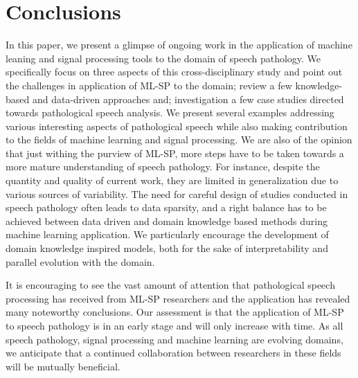 \documentclass{article}
\begin{document}
\section{Conclusions}

In this paper, we present a glimpse of ongoing work in the application of machine leaning and signal processing tools to the domain of speech pathology.
We specifically focus on three aspects of this cross-disciplinary study and point out the challenges in application of ML-SP to the domain; review a few knowledge-based and data-driven approaches and; investigation a few case studies directed towards pathological speech analysis.
We present several examples addressing various interesting aspects of pathological speech while also making contribution to the fields of machine learning and signal processing. 
We are also of the opinion that just withing the purview of ML-SP, more steps have to be taken towards a more mature understanding of speech pathology. 
For instance, despite the quantity and quality of current work, they are limited in generalization due to various sources of variability.
The need for careful design of studies conducted in speech pathology often leads to data sparsity, and a right balance has to be achieved between data driven and domain knowledge based methods during machine learning application.
We particularly encourage the development of domain knowledge inspired models, both for the sake of interpretability and parallel evolution with the domain. 

It is encouraging to see the vast amount of attention that pathological speech processing has received from ML-SP researchers and the application has revealed many noteworthy conclusions.
Our assessment is that the application of ML-SP to speech pathology is in an early stage and will only increase with time.
As all speech pathology, signal processing and machine learning are evolving domains, we anticipate that a continued collaboration between researchers in these fields will be mutually beneficial.

\begin{spacing}{.84}



\end{spacing}
\end{document}
